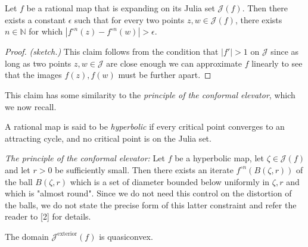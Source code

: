\begin{claim}Let\textbf{ $f$ }be a rational map that is expanding
on its Julia set $\mathcal{J}(f)$. Then there exists a constant $\epsilon$
such that for every two points $z,w\in\mathcal{J}(f)$, there exists
$n\in\mathbb{N}$ for which $\left|f^{\circ n}(z)-f^{\circ n}(w)\right|>\epsilon$.
\end{claim}
\begin{proof}
\emph{(sketch.)}\textbf{ }This claim follows from the condition that
$\left|f'\right|>1$ on $\mathcal{J}$ since as long as two points
$z,w\in\mathcal{J}$ are close enough we can approximate $f$ linearly
to see that the images $f(z),f(w)$ must be further apart. 
\end{proof}
\begin{comment}
We may alternatively see this claim as a degenerate version of the
principle of conformal elevator, which we briefly recall.
\end{comment}

\begin{remark}
This claim has some similarity to the \emph{principle of the conformal
elevator}, which we now recall.

A rational map is said to be \emph{hyperbolic }if every critical point
converges to an attracting cycle, and no critical point is on the
Julia set.

\emph{The principle of the conformal elevator: }Let $f$ be a hyperbolic
map, let $\zeta\in\mathcal{J}(f)$ and let $r>0$ be sufficiently
small. Then there exists an iterate $f^{\circ n}(B(\zeta,r))$ of
the ball $B(\zeta,r)$ which is a set of diameter bounded below uniformly
in $\zeta,r$ and which is "almost round".
Since we do not need this control on the distortion of the balls,
we do not state the precise form of this latter constraint and refer
the reader to {[}2{]} for details.
\end{remark}

\begin{comment}
Since we only need to make a pair of points on the Julia set a fixed
distance apart.
\end{comment}

\begin{comment}
In this case we have available the conformal elevator principle, which
allows enlarging every ball centered at $\mathcal{J}(f)$ to a
definite size by iteratively applying $f$. 
\end{comment}

\begin{theorem}
The domain $\mathcal{J}^{\text{exterior}}(f)$ is quasiconvex.
\end{theorem}

